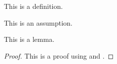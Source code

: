 
\begin{definition}\label{def}
  This is a definition.
\end{definition}

\begin{assumption}\label{ass}
  This is an assumption.
\end{assumption}

\begin{lemma}\label{lem}
  This is a lemma.
\end{lemma}

\begin{proof}
  This is a proof using  and .
\end{proof}